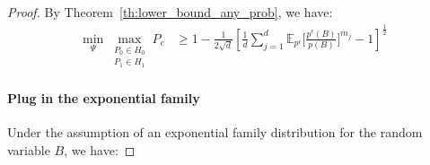 \begin{proof}
    By Theorem~\ref{th:lower_bound_any_prob}, we have:
\begin{align*}
      \min _{\Psi} 
    \max _{\substack{P_0 \in H_0 \\ P_1 \in H_1}}
        P_e 
        &\geq 1 - \frac{1}{2\sqrt{d}}\left[
             \frac{1}{d}
            \sum_{j=1}^d \mathbb{E}_{p^\epsilon}\Bigg[
           \frac{p^{\epsilon}(B)}{p(B)}\Bigg]^{m_j}
            -1
            \right]^{\frac{1}{2}}
\end{align*}
\paragraph{Plug in the exponential family} Under the assumption of an exponential family distribution for the random variable $B$, we have:


\end{proof}
